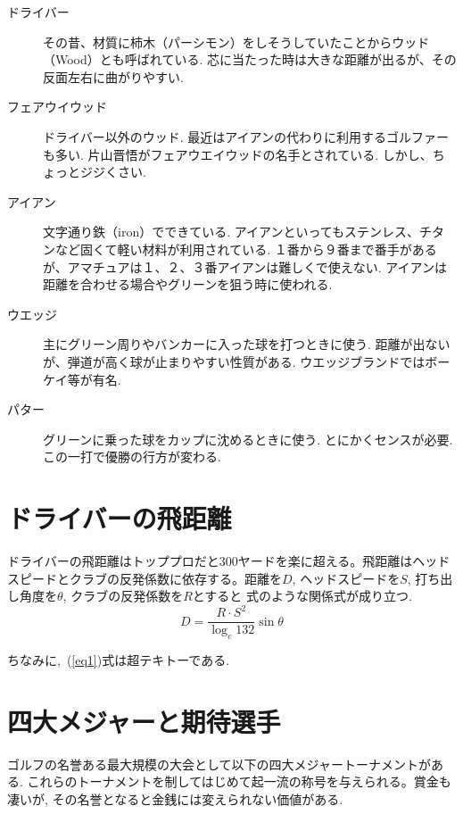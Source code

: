 \documentclass[a4j, twocolumn]{jarticle}
\begin{document}
\begin{description}
  \item[ドライバー] その昔、材質に柿木（パーシモン）をしそうしていたことからウッド（Wood）とも呼ばれている. 芯に当たった時は大きな距離が出るが、その反面左右に曲がりやすい. 
  \item[フェアウイウッド] ドライバー以外のウッド. 最近はアイアンの代わりに利用するゴルファーも多い. 片山晋悟がフェアウエイウッドの名手とされている. しかし、ちょっとジジくさい.   
  \item[アイアン] 文字通り鉄（iron）でできている. アイアンといってもステンレス、チタンなど固くて軽い材料が利用されている. １番から９番まで番手があるが、アマチュアは１、２、３番アイアンは難しくで使えない. アイアンは距離を合わせる場合やグリーンを狙う時に使われる. 
  \item[ウエッジ] 主にグリーン周りやバンカーに入った球を打つときに使う. 距離が出ないが、弾道が高く球が止まりやすい性質がある. ウエッジブランドではボーケイ等が有名.
  \item[パター] グリーンに乗った球をカップに沈めるときに使う. とにかくセンスが必要. この一打で優勝の行方が変わる.
\end{description}

\section{ドライバーの飛距離}
ドライバーの飛距離はトッププロだと300ヤードを楽に超える。飛距離はヘッドスピードとクラブの反発係数に依存する。距離を$D$, ヘッドスピードを$S$, 打ち出し角度を$\theta$, クラブの反発係数を$R$とすると 式のような関係式が成り立つ\cite{GOLFRULE}.
\begin{equation}\label{eq1}
  D=\frac{R\cdot S^2}{\log_e132}\sin\theta
\end{equation}

ちなみに,~(\ref{eq1})式は超テキトーである.

\section{四大メジャーと期待選手}
ゴルフの名誉ある最大規模の大会として以下の四大メジャートーナメントがある. これらのトーナメントを制してはじめて起一流の称号を与えられる。賞金も凄いが, その名誉となると金銭には変えられない価値がある.
\end{document}
